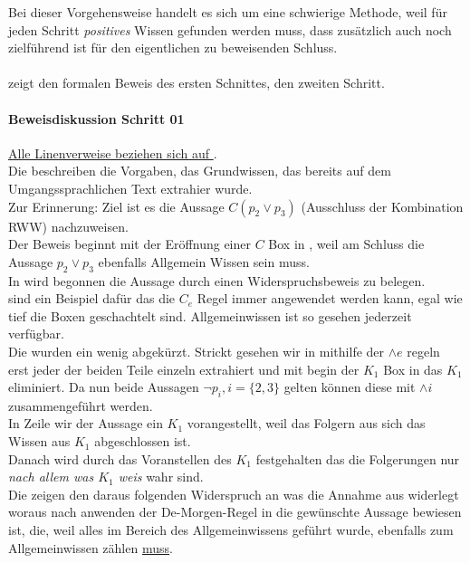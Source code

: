 Bei dieser Vorgehensweise handelt es sich um eine schwierige Methode, weil für jeden Schritt \emph{positives} Wissen gefunden werden muss, dass zusätzlich auch noch zielführend ist für den eigentlichen zu beweisenden Schluss.\\\\


 zeigt den formalen Beweis des ersten Schnittes,  den zweiten Schritt.


\paragraph{Beweisdiskussion \WMR Schritt 01}
\underline{Alle Linenverweise beziehen sich auf }.\\
Die  beschreiben die Vorgaben, das Grundwissen, das bereits auf dem Umgangssprachlichen Text extrahier wurde.\\
Zur Erinnerung: Ziel ist es die Aussage $C(p_2 \vee p_3)$ (Ausschluss der Kombination RWW) nachzuweisen.\\
Der Beweis beginnt mit der Eröffnung einer $C$ Box in , weil am Schluss die Aussage $p_2 \vee p_3$ ebenfalls Allgemein Wissen sein muss.\\
In  wird begonnen die Aussage durch einen Widerspruchsbeweis zu belegen.\\
 sind ein Beispiel dafür das die $C_e$ Regel immer angewendet werden kann, egal wie tief die Boxen geschachtelt sind.
Allgemeinwissen ist so gesehen jederzeit verfügbar.\\
Die  wurden ein wenig abgekürzt.
Strickt gesehen wir in  mithilfe der $\wedge e$ regeln erst jeder der beiden Teile einzeln extrahiert und mit begin der $K_1$ Box in  das $K_1$ eliminiert.
Da nun beide Aussagen $\neg p_i, i=\{2,3\}$ gelten können diese mit $\wedge i$ zusammengeführt werden.\\
In Zeile  wir der Aussage ein $K_1$ vorangestellt, weil das Folgern aus sich das Wissen aus $K_1$ abgeschlossen ist.\\
Danach wird durch das Voranstellen des $K_1$ festgehalten das die Folgerungen nur \emph{nach allem was $K_1$ weis} wahr sind.\\
Die  zeigen den daraus folgenden Widerspruch an was die Annahme aus  widerlegt woraus nach anwenden der De-Morgen-Regel in  die gewünschte Aussage bewiesen ist, die, weil alles im Bereich des Allgemeinwissens geführt wurde, ebenfalls zum Allgemeinwissen zählen \underline{muss}.


